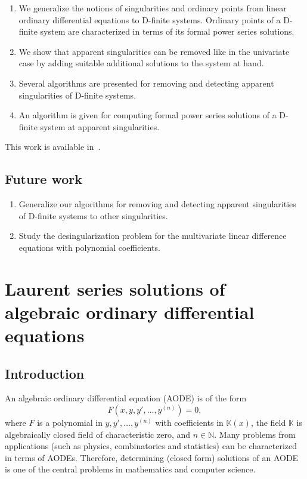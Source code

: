 \documentclass[10pt,a4paper]{article}
\newcommand{\bN}{ {\mathbb  N}}
\newcommand{\bK}{ {\mathbb  K}}
\begin{document}
\begin{enumerate}
 \item We generalize the notions of singularities and ordinary points from linear ordinary differential equations to D-finite systems. 
 Ordinary points of a D-finite system are characterized in terms of its formal power series solutions.
 \item We show that apparent singularities can be removed like in the univariate
case by adding suitable additional solutions to the system at hand.
 \item Several algorithms are presented for removing and detecting apparent singularities of D-finite systems.
 \item An algorithm is given for computing formal power series solutions of a D-finite system
at apparent singularities.
\end{enumerate}

This work is available in~\cite{Yi2017}.

\subsection{Future work}

\begin{enumerate}
 \item Generalize our algorithms for removing and detecting apparent singularities of D-finite systems to other singularities.
 \item Study the desingularization problem for the multivariate linear difference equations with polynomial coefficients. 
\end{enumerate}

\section{Laurent series solutions of algebraic ordinary differential equations} \label{SECT:Laurentsols}

\subsection{Introduction}

An algebraic ordinary differential equation (AODE) is of the form 
$$F(x,y,y',\ldots,y^{(n)})=0,$$ 
where $F$ is a polynomial in $y,y',\ldots,y^{(n)}$ with coefficients in $\mathbb{K}(x)$, the field $\bK$ is 
algebraically closed field of characteristic zero, and $n \in \bN$. 
Many problems from applications (such as physics, combinatorics and statistics) 
can be characterized in terms of AODEs.  
Therefore, determining (closed form) solutions of an AODE is one of the central problems in mathematics and computer science.
 
\end{document}

